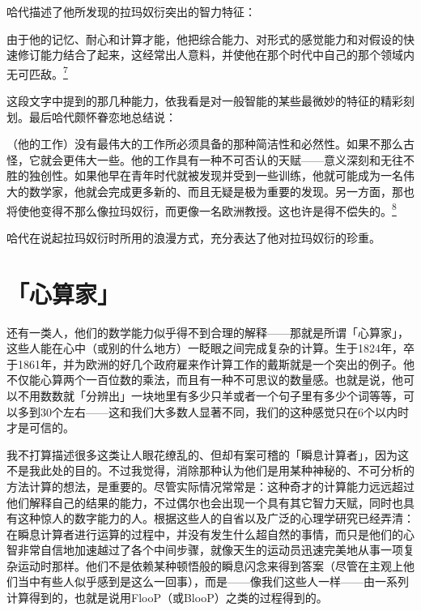 \documentclass[
  12pt,
  twoside,
  openright,
  oldfontcommands,
]{memoir}
\newenvironment{fsquote}{%
  \begin{mdframed}[style=gebquote]\kaitifamily\small%
}{%
  \end{mdframed}%
}
\begin{document}
哈代描述了他所发现的拉玛奴衍突出的智力特征：

\begin{fsquote}
由于他的记忆、耐心和计算才能，他把综合能力、对形式的感觉能力和对假设的快速修订能力结合了起来，这经常出人意料，并使他在那个时代中自己的那个领域内无可匹敌。\hyperref[fn:Chapter17-7]{\textsuperscript{7}}
\end{fsquote}

这段文字中提到的那几种能力，依我看是对一般智能的某些最微妙的特征的精彩刻划。最后哈代颇怀眷恋地总结说：

\begin{fsquote}
（他的工作）没有最伟大的工作所必须具备的那种简洁性和必然性。如果不那么古怪，它就会更伟大一些。他的工作具有一种不可否认的天赋------意义深刻和无往不胜的独创性。如果他早在青年时代就被发现并受到一些训练，他就可能成为一名伟大的数学家，他就会完成更多新的、而且无疑是极为重要的发现。另一方面，那也将使他变得不那么像拉玛奴衍，而更像一名欧洲教授。这也许是得不偿失的。\hyperref[fn:Chapter17-8]{\textsuperscript{8}}
\end{fsquote}

哈代在说起拉玛奴衍时所用的浪漫方式，充分表达了他对拉玛奴衍的珍重。

\section{「心算家」}

还有一类人，他们的数学能力似乎得不到合理的解释------那就是所谓「心算家」，这些人能在心中（或别的什么地方）一眨眼之间完成复杂的计算。生于1824年，卒于1861年，并为欧洲的好几个政府雇来作计算工作的戴斯就是一个突出的例子。他不仅能心算两个一百位数的乘法，而且有一种不可思议的数量感。也就是说，他可以不用数数就「分辨出」一块地里有多少只羊或者一个句子里有多少个词等等，可以多到30个左右------这和我们大多数人显著不同，我们的这种感觉只在6个以内时才是可信的。

我不打算描述很多这类让人眼花缭乱的、但却有案可稽的「瞬息计算者」，因为这不是我此处的目的。不过我觉得，消除那种认为他们是用某种神秘的、不可分析的方法计算的想法，是重要的。尽管实际情况常常是：这种奇才的计算能力远远超过他们解释自己的结果的能力，不过偶尔也会出现一个具有其它智力天赋，同时也具有这种惊人的数字能力的人。根据这些人的自省以及广泛的心理学研究已经弄清：在瞬息计算者进行运算的过程中，并没有发生什么超自然的事情，而只是他们的心智非常自信地加速越过了各个中间步骤，就像天生的运动员迅速完美地从事一项复杂运动时那样。他们不是依赖某种顿悟般的瞬息闪念来得到答案（尽管在主观上他们当中有些人似乎感到是这么一回事），而是------像我们这些人一样------由一系列计算得到的，也就是说用FlooP（或BlooP）之类的过程得到的。
\end{document}
